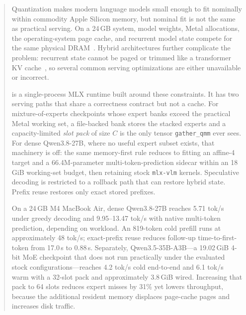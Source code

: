 \author{
Andre Heid\\
Yale University\\
\texttt{andre.h.costa@yale.edu}
}

\date{2 September 2026 \\[0.3em] \small Systems manuscript (single-machine study)}


\maketitle
\thispagestyle{fancy}

\begin{abstract}
Quantization makes modern language models small enough to fit nominally within commodity Apple Silicon memory, but nominal fit is not the same as practical serving. On a 24\,GB system, model weights, Metal allocations, the operating-system page cache, and recurrent model state compete for the same physical DRAM~\citep{appleum}. Hybrid architectures further complicate the problem: recurrent \gdn{} state cannot be paged or trimmed like a transformer KV cache~\citep{yang2024gateddelta,qwen3}, so several common serving optimizations are either unavailable or incorrect.

\slotbank{} is a single-process MLX runtime built around these constraints. It has two serving paths that share a correctness contract but not a cache. For mixture-of-experts checkpoints whose expert banks exceed the practical Metal working set, a file-backed bank stores the stacked experts and a capacity-limited \emph{slot pack} of size $C$ is the only tensor \texttt{gather\_qmm} ever sees. For dense Qwen3.8-27B, where no useful expert subset exists, that machinery is off: the same memory-first rule reduces to fitting an affine-4 target and a 66.4M-parameter multi-token-prediction sidecar within an 18\,GiB working-set budget, then retaining stock \texttt{mlx-vlm} kernels. Speculative decoding is restricted to a rollback path that can restore hybrid state. Prefix reuse restores only exact stored prefixes.

On a 24\,GB M4 MacBook Air, dense Qwen3.8-27B reaches 5.71 tok/s under greedy decoding and 9.95--13.47 tok/s with native multi-token prediction, depending on workload. An 819-token cold prefill runs at approximately 48 tok/s; exact-prefix reuse reduces follow-up time-to-first-token from 17.0\,s to 0.88\,s. Separately, Qwen3.5-35B-A3B---a 19.02\,GiB 4-bit MoE checkpoint that does not run practically under the evaluated stock configurations---reaches 4.2 tok/s cold end-to-end and 6.1 tok/s warm with a 32-slot pack and approximately 3.8\,GiB wired. Increasing that pack to 64 slots reduces expert misses by 31\% yet lowers throughput, because the additional resident memory displaces page-cache pages and increases disk traffic.


\end{abstract}

